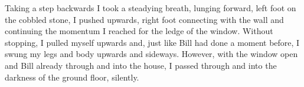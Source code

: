 Taking a step backwards I took a steadying breath, lunging forward, left foot on
the cobbled stone, I pushed upwards, right foot connecting with the wall and
continuing the momentum I reached for the ledge of the window. Without stopping,
I pulled myself upwards and, just like Bill had done a moment before, I swung my
legs and body upwards and sideways. However, with the window open and Bill
already through and into the house, I passed through and into the darkness of
the ground floor, silently.











